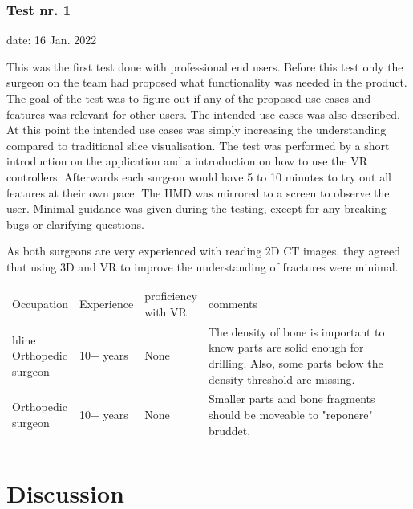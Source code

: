 \documentclass[a4paper]{report}
\begin{document}
\subsection{Test nr. 1}
date: 16 Jan. 2022

This was the first test done with professional end users. Before this test only the surgeon on the team had proposed what functionality was needed in the product.
The goal of the test was to figure out if any of the proposed use cases and features was relevant for other users. 
The intended use cases was also described. At this point the intended use cases was simply increasing the understanding compared to traditional slice visualisation.
The test was performed by a short introduction on the application and a introduction on how to use the VR controllers. Afterwards each surgeon would have 5 to 10 minutes to try out all features at their own pace. The HMD was mirrored to a screen to observe the user. Minimal guidance was given during the testing, except for any breaking bugs or clarifying questions.

As both surgeons are very experienced with reading 2D CT images, they agreed that using 3D and VR to improve the understanding of fractures were minimal.

\begin{table}[ht]
\begin{tabular}{p{0.15\linewidth} |p{0.15\linewidth} |p{0.15\linewidth} | p{0.5\linewidth}}
Occupation         & Experience & proficiency with VR & comments                                                                                                                                \\hline
Orthopedic surgeon & 10+ years  & None                & The density of bone is important to know parts are solid enough for drilling. Also, some parts below the density threshold are missing. \\
Orthopedic surgeon & 10+ years  & None                & Smaller parts and bone fragments should be moveable to "reponere" bruddet.                                                              \\
                   &            &                     &
\end{tabular}
\end{table}


\chapter{Discussion}\label{Discussion}
\end{document}
